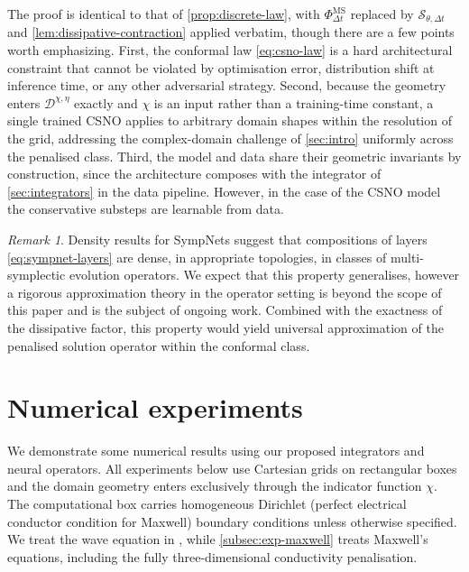 \documentclass[11pt]{article}
\theoremstyle{definition}
\theoremstyle{remark}
\newtheorem{remark}[theorem]{Remark}
\newcommand{\Do}{\mathcal{D}}
\newcommand{\So}{\mathcal{S}}
\begin{document}
The proof is identical to that of \cref{prop:discrete-law}, with
$\Phi^{\mathrm{MS}}_{\Delta t}$ replaced by $\So_{\theta,\Delta t}$
and \cref{lem:dissipative-contraction} applied verbatim, though there are a few points worth emphasizing.  First, the conformal law
\eqref{eq:csno-law} is a hard architectural constraint that cannot be violated by optimisation error, distribution shift at inference time, or any other adversarial strategy. Second, because the geometry enters $\Do^{\chi,\eta}$ exactly and $\chi$ is an input rather than a training-time constant, a single trained CSNO applies to arbitrary domain shapes within the resolution of the grid, addressing the complex-domain challenge of \cref{sec:intro} uniformly across the penalised class. Third, the model and data share their geometric invariants by construction, since the architecture composes with the integrator of \cref{sec:integrators} in the data pipeline. However, in the case of the CSNO model the conservative substeps are learnable from data.

\begin{remark}
Density results for SympNets \cite{jin2020sympnets} suggest that
compositions of layers \eqref{eq:sympnet-layers} are dense, in
appropriate topologies, in classes of multi-symplectic evolution
operators. We expect that this property generalises, however a rigorous approximation theory in the operator setting is beyond the scope of this paper and is the subject of ongoing work. Combined with the exactness of the dissipative factor, this property would yield universal approximation of the penalised solution operator within the conformal class.  
\end{remark}

\section{Numerical experiments}
\label{sec:experiments}

We demonstrate some numerical results using our proposed integrators and neural operators. All experiments below use Cartesian grids on rectangular boxes and the domain geometry enters exclusively through the indicator function $\chi$. The computational box carries homogeneous Dirichlet (perfect electrical conductor condition for Maxwell) boundary conditions unless otherwise specified. We treat the wave equation in
, while \cref{subsec:exp-maxwell} treats Maxwell's equations,
including the fully three-dimensional conductivity penalisation.  
\end{document}
